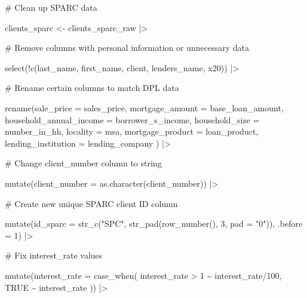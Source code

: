 \documentclass[
  letterpaper,
  DIV=11,
  numbers=noendperiod]{scrartcl}
\newenvironment{Shaded}{\begin{snugshade}}{\end{snugshade}}
\newcommand{\AttributeTok}[1]{\textcolor[rgb]{0.40,0.45,0.13}{#1}}
\newcommand{\CommentTok}[1]{\textcolor[rgb]{0.37,0.37,0.37}{#1}}
\newcommand{\ConstantTok}[1]{\textcolor[rgb]{0.56,0.35,0.01}{#1}}
\newcommand{\DecValTok}[1]{\textcolor[rgb]{0.68,0.00,0.00}{#1}}
\newcommand{\FunctionTok}[1]{\textcolor[rgb]{0.28,0.35,0.67}{#1}}
\newcommand{\NormalTok}[1]{\textcolor[rgb]{0.00,0.23,0.31}{#1}}
\newcommand{\OtherTok}[1]{\textcolor[rgb]{0.00,0.23,0.31}{#1}}
\newcommand{\SpecialCharTok}[1]{\textcolor[rgb]{0.37,0.37,0.37}{#1}}
\newcommand{\StringTok}[1]{\textcolor[rgb]{0.13,0.47,0.30}{#1}}
\begin{document}
\begin{Shaded}
\begin{Highlighting}[]
\CommentTok{\# Clean up SPARC data}

\NormalTok{clients\_sparc }\OtherTok{\textless{}{-}}\NormalTok{ clients\_sparc\_raw }\SpecialCharTok{|\textgreater{}} 
  
  \CommentTok{\# Remove columns with personal information or unnecessary data}
  
  \FunctionTok{select}\NormalTok{(}\SpecialCharTok{!}\FunctionTok{c}\NormalTok{(last\_name, first\_name, client,}
\NormalTok{            lenders\_name, x20)) }\SpecialCharTok{|\textgreater{}} 
  
  \CommentTok{\# Rename certain columns to match DPL data}
  
  \FunctionTok{rename}\NormalTok{(}\AttributeTok{sale\_price =}\NormalTok{ sales\_price,}
         \AttributeTok{mortgage\_amount =}\NormalTok{ base\_loan\_amount,}
         \AttributeTok{household\_annual\_income =}\NormalTok{ borrower\_s\_income,}
         \AttributeTok{household\_size =}\NormalTok{ number\_in\_hh,}
         \AttributeTok{locality =}\NormalTok{ msa,}
         \AttributeTok{mortgage\_product =}\NormalTok{ loan\_product,}
         \AttributeTok{lending\_institution =}\NormalTok{ lending\_company}
\NormalTok{         ) }\SpecialCharTok{|\textgreater{}} 
  
  \CommentTok{\# Change client\_number column to string}
  
  \FunctionTok{mutate}\NormalTok{(}\AttributeTok{client\_number =} \FunctionTok{as.character}\NormalTok{(client\_number)) }\SpecialCharTok{|\textgreater{}} 
  
  \CommentTok{\# Create new unique SPARC client ID column}
  
  \FunctionTok{mutate}\NormalTok{(}\AttributeTok{id\_sparc =} \FunctionTok{str\_c}\NormalTok{(}\StringTok{"SPC"}\NormalTok{, }\FunctionTok{str\_pad}\NormalTok{(}\FunctionTok{row\_number}\NormalTok{(), }\DecValTok{3}\NormalTok{, }\AttributeTok{pad =} \StringTok{"0"}\NormalTok{)),}
         \AttributeTok{.before =} \DecValTok{1}\NormalTok{) }\SpecialCharTok{|\textgreater{}} 
  
  \CommentTok{\# Fix interest\_rate values}
  
  \FunctionTok{mutate}\NormalTok{(}\AttributeTok{interest\_rate =} \FunctionTok{case\_when}\NormalTok{(}
\NormalTok{    interest\_rate }\SpecialCharTok{\textgreater{}} \DecValTok{1} \SpecialCharTok{\textasciitilde{}}\NormalTok{ interest\_rate}\SpecialCharTok{/}\DecValTok{100}\NormalTok{,}
    \ConstantTok{TRUE} \SpecialCharTok{\textasciitilde{}}\NormalTok{ interest\_rate}
\NormalTok{  )) }\SpecialCharTok{|\textgreater{}} 
  

\end{Highlighting}
\end{Shaded}
\end{document}
